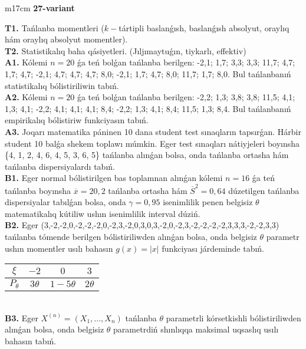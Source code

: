 \documentclass{article}
\begin{document}
\begin{tabular}{m{17cm}}
\textbf{27-variant}
\newline

\textbf{T1.} 
Tańlanba momentleri (\(k -\)tártipli baslanǵısh, baslanǵısh absolyut, oraylıq hám oraylıq absolyut momentler).
 \\
\textbf{T2.} 
Statistikalıq baha qásiyetleri. (Jıljımaytuǵın, tiykarlı, effektiv)
 \\
\textbf{A1.} 
Kólemi \(n = 20\) ǵa teń bolǵan tańlanba berilgen: -2,1; 1,7; 3,3; 3,3; 11,7; 4,7; 1,7; 4,7; -2,1; 4,7; 4,7; 4,7; 8,0; -2,1; 1,7; 4,7; 8,0; 11,7; 1,7; 8,0. Bul tańlanbanıń statistikalıq bólistiriliwin tabıń.
 \\
\textbf{A2.} 
Kólemi \(n = 20\) ǵa teń bolǵan tańlanba berilgen: -2,2; 1,3; 3,8; 3,8; 11,5; 4,1; 1,3; 4,1; -2,2; 4,1; 4,1; 4,1; 8,4; -2,2; 1,3; 4,1; 8,4; 11,5; 1,3; 8,4. Bul tańlanbanıń empirikalıq bólistiriw funkciyasın tabıń.
 \\
\textbf{A3.} 
Joqarı matematika páninen 10 dana student test sınaqların tapsırǵan. Hárbir student 10 balǵa shekem toplawı múmkin. Eger test sınaqları nátiyjeleri boyınsha \{4, 1, 2, 4, 6, 4, 5, 3, 6, 5\} tańlanba alınǵan bolsa, onda tańlanba ortasha hám tańlanba dispersiyalardı tabıń.
 \\
\textbf{B1.} 
Eger normal bólistirilgen bas toplamnan alınǵan kólemi \(n = 16\) ǵa teń tańlanba boyınsha \(\overline{x} = 20,2\) tańlanba ortasha hám \({\overline{S}}^{2} = 0,64\) dúzetilgen tańlanba dispersiyalar tabılǵan bolsa, onda \(\gamma = 0,95\) isenimlilik penen belgisiz \(\theta\) matematikalıq kútiliw ushın isenimlilik interval dúziń.
 \\
\textbf{B2.} 
Eger (3,-2,-2,0,-2,-2,-2,0,-2,3,-2,0,3,0,3,-2,0,-2,3,-2,-2,-2,-2,3,3,3,-2,-2,3,3) tańlanba tómende berilgen bólistiriliwden alınǵan bolsa, onda belgisiz \(\theta\) parametr ushın momentler usılı bahasın \(g(x) = |x|\) funkciyası járdeminde tabıń.
\begin{tabular}{|c|c|c|c|}
  \hline
$\xi$ &
$- 2$ &
$0$ &
$3$ \\
\hline
\(P_{\theta}\) & \(3\theta\) & \(1 - 5\theta\) & \(2\theta\) \\
\hline
\end{tabular}
 \\
\textbf{B3.} 
Eger \(X^{(n)} = \left( X_{1},...,X_{n} \right)\) tańlanba \(\theta\) parametrli kórsetkishli bólistiriliwden alınǵan bolsa, onda belgisiz \(\theta\) parametrdiń shınlıqqa maksimal uqsaslıq usılı bahasın tabıń.
 \\

\end{tabular}
\end{document}
